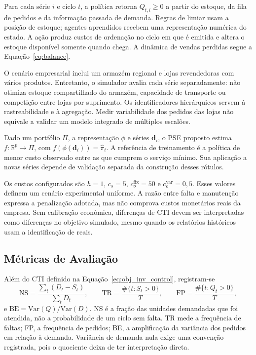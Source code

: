 Para cada série $i$ e ciclo $t$, a política retorna $Q_{t,i}\geq0$ a partir do estoque, da fila de pedidos e da informação passada de demanda. Regras de limiar usam a posição de estoque; agentes aprendidos recebem uma representação numérica do estado. A ação produz custos de ordenação no ciclo em que é emitida e altera o estoque disponível somente quando chega. A dinâmica de vendas perdidas segue a Equação~\ref{eq:balance}.

O cenário empresarial inclui um armazém regional e lojas revendedoras com vários produtos. Entretanto, o simulador avalia cada série separadamente: não otimiza estoque compartilhado do armazém, capacidade de transporte ou competição entre lojas por suprimento. Os identificadores hierárquicos servem à rastreabilidade e à agregação. Medir variabilidade dos pedidos das lojas não equivale a validar um modelo integrado de múltiplos escalões.

\begin{defi}
Dado um portfólio $\Pi$, a representação $\phi$ e séries $\mathbf d_i$, o PSE proposto estima $f:\mathbb R^p\rightarrow\Pi$, com $f(\phi(\mathbf d_i))=\hat\pi_i$. A referência de treinamento é a política de menor custo observado entre as que cumprem o serviço mínimo. Sua aplicação a novas séries depende de validação separada da construção desses rótulos.
\end{defi}

Os custos configurados são $h=1$, $c_s=5$, $c_o^{\mathrm{fix}}=50$ e $c_o^{\mathrm{var}}=0{,}5$. Esses valores definem um cenário experimental uniforme. A razão entre falta e manutenção expressa a penalização adotada, mas não comprova custos monetários reais da empresa. Sem calibração econômica, diferenças de CTI devem ser interpretadas como diferenças no objetivo simulado, mesmo quando os relatórios históricos usam a identificação de reais.

\subsection{Métricas de Avaliação}
\label{sec:metricas_avaliacao}

Além do CTI definido na Equação~\ref{eq:obj_inv_control}, registram-se
\[
\mathrm{NS}=\frac{\sum_t(D_t-S_t)}{\sum_tD_t},\qquad
\mathrm{TR}=\frac{\#\{t:S_t>0\}}T,\qquad
\mathrm{FP}=\frac{\#\{t:Q_t>0\}}T,
\]
e $\mathrm{BE}=\mathrm{Var}(Q)/\mathrm{Var}(D)$. NS é a fração das unidades demandadas que foi atendida, não a probabilidade de um ciclo sem falta. TR mede a frequência de faltas; FP, a frequência de pedidos; BE, a amplificação da variância dos pedidos em relação à demanda. Variância de demanda nula exige uma convenção registrada, pois o quociente deixa de ter interpretação direta.

